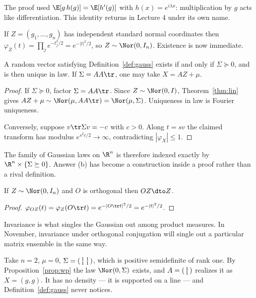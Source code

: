 \documentclass[11pt]{article}
\begin{document}
\begin{remark}
The proof used $\E[g\,h(g)]=\E[h'(g)]$ with $h(x)=e^{i\lambda x}$: multiplication by $g$ acts like differentiation. This identity returns in Lecture 4 under its own name.
\end{remark}

If $Z=(g_1,\dots,g_n)$ has independent standard normal coordinates then $\varphi_Z(t)=\prod_j e^{-t_j^2/2}=e^{-|t|^2/2}$, so $Z\sim\Nor(0,I_n)$. Existence is now immediate.

\begin{proposition}\label{prop:wp}
A random vector satisfying Definition~\ref{def:gauss} exists if and only if $\Sigma\succeq0$, and is then unique in law. If $\Sigma=AA\tr$, one may take $X=AZ+\mu$.
\end{proposition}

\begin{proof}
If $\Sigma\succeq0$, factor $\Sigma=AA\tr$. Since $Z\sim\Nor(0,I)$, Theorem~\ref{thm:lin} gives $AZ+\mu\sim\Nor(\mu,AA\tr)=\Nor(\mu,\Sigma)$. Uniqueness in law is Fourier uniqueness.

Conversely, suppose $v\tr\Sigma v=-c$ with $c>0$. Along $t=sv$ the claimed transform has modulus $e^{s^2c/2}\to\infty$, contradicting $|\varphi_X|\le1$.
\end{proof}

The family of Gaussian laws on $\R^n$ is therefore indexed exactly by $\R^n\times\{\Sigma\succeq0\}$. Answer (b) has become a construction inside a proof rather than a rival definition.

\begin{corollary}\label{cor:rot}
If $Z\sim\Nor(0,I_n)$ and $O$ is orthogonal then $OZ\dto Z$.
\end{corollary}

\begin{proof}
$\varphi_{OZ}(t)=\varphi_Z(O\tr t)=e^{-|O\tr t|^2/2}=e^{-|t|^2/2}$.
\end{proof}

Invariance is what singles the Gaussian out among product measures. In November, invariance under orthogonal conjugation will single out a particular matrix ensemble in the same way.

\begin{example}
Take $n=2$, $\mu=0$, $\Sigma=\begin{psmallmatrix}1&1\\1&1\end{psmallmatrix}$, which is positive semidefinite of rank one. By Proposition~\ref{prop:wp} the law $\Nor(0,\Sigma)$ exists, and $A=\begin{psmallmatrix}1\\1\end{psmallmatrix}$ realizes it as $X=(g,g)$. It has no density --- it is supported on a line --- and Definition~\ref{def:gauss} never notices.
\end{example}
\end{document}
